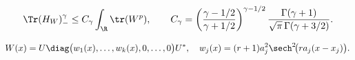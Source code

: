 \begin{equation}\label{intro:sharp}
 \Tr(H_W)_-^\gamma\le C_\gamma\int_\R\tr(W^p),
 \qquad
 C_\gamma=\left(\frac{\gamma-1/2}{\gamma+1/2}\right)^{\gamma-1/2}
       \frac{\Gamma(\gamma+1)}{\sqrt\pi\,\Gamma(\gamma+3/2)}.
\end{equation}

\begin{equation}\label{intro:classification}
 W(x)=U\diag\bigl(w_1(x),\ldots,w_k(x),0,\ldots,0\bigr)U^*,
 \quad
 w_j(x)=(r+1)a_j^2\sech^2\!\bigl(ra_j(x-x_j)\bigr).
\end{equation}
